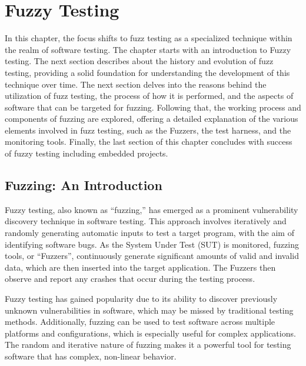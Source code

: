 \vspace{21.5pt}
\chapter{Fuzzy Testing}
In this chapter, the focus shifts to fuzz testing as a specialized technique within the realm of
software testing. The chapter starts with an introduction to Fuzzy testing.  The next section describes
about the history and evolution of fuzz testing, providing a solid foundation for understanding the
development of this technique over time. The next section delves into the reasons behind the
utilization of fuzz testing, the process of how it is performed, and the aspects of software
that can be targeted for fuzzing. Following that, the working process and components of
fuzzing are explored, offering a detailed explanation of the various elements involved in fuzz testing,
such as the Fuzzers, the test harness, and the monitoring tools. Finally, the last section of this chapter
concludes with success of fuzzy testing including embedded projects.

\section{Fuzzing: An Introduction}

Fuzzy testing, also known as ``fuzzing,'' has emerged as a prominent vulnerability discovery
technique in software testing. This approach involves iteratively and randomly generating automatic
inputs to test a target program, with the aim of identifying software bugs. As the
System Under Test (SUT) is monitored, fuzzing tools, or ``Fuzzers'', continuously generate
significant amounts of valid and invalid data, which are then inserted into the target application.
The Fuzzers then observe and report any crashes that occur during the testing
process\cite{klees2018evaluating}\cite{li2018fuzzing}.

Fuzzy testing has gained popularity due to its ability to discover previously unknown
vulnerabilities in software, which may be missed by traditional testing methods.
Additionally, fuzzing can be used to test software across multiple platforms and
configurations, which is especially useful for complex applications.
The random and iterative nature of fuzzing makes it a powerful tool for testing software that
has complex, non-linear behavior\cite{klees2018evaluating}.

